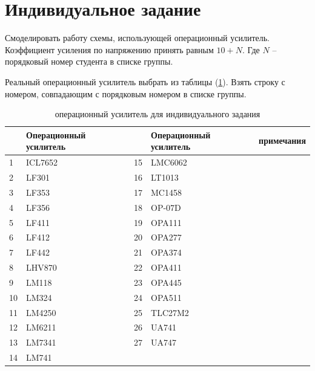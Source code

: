 
\vspace{-3cm}
\section{Индивидуальное задание}

Смоделировать работу схемы, использующей операционный усилитель. Коэффициент усиления по напряжению принять равным $10 + N$. Где $N$  -- порядковый номер студента в списке группы.

Реальный операционный усилитель выбрать из таблицы (\ref{opamp}). Взять строку с номером, совпадающим с порядковым номером в списке группы.

{\small
\begin{table}[!ht]
	\caption{операционный усилитель для индивидуального задания}
\begin{tabular}{ll|lll}
\toprule
	\No& Операционный усилитель&\No& Операционный усилитель& примечания\\
\midrule
1&ICL7652&15&LMC6062 &\\
2&LF301  &16&LT1013  &\\
3&LF353  &17&MC1458  &\\
4&LF356  &18&OP-07D  &\\
5&LF411  &19&OPA111  &\\
6&LF412  &20&OPA277  &\\
7&LF442  &21&OPA374  &\\
8&LHV870 &22&OPA411  &\\
9&LM118  &23&OPA445  &\\
10&LM324 &24&OPA511  &\\
11&LM4250&25&TLC27M2 &\\
12&LM6211&26&UA741   &\\
13&LM7341&27&UA747   &\\
14&LM741 &\\
\bottomrule
\end{tabular}
	\label{opamp}
\end{table}
}

